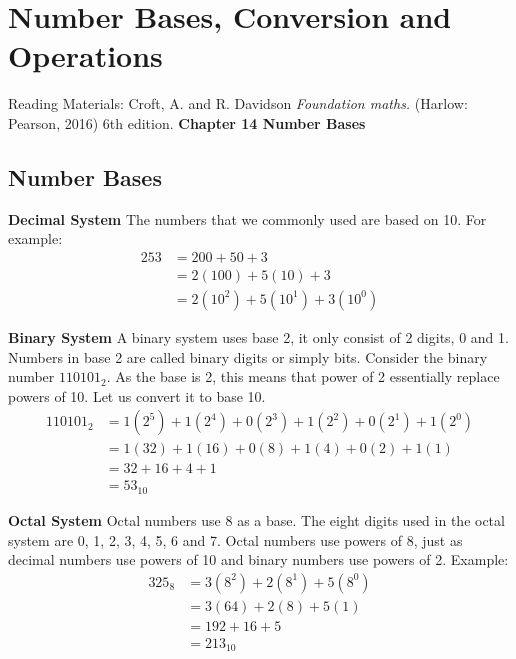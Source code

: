 \chapter{Number Bases, Conversion and Operations}

Reading Materials: \newline
Croft, A. and R. Davidson \textit{Foundation maths.} (Harlow: Pearson, 2016) 6th edition. \textbf{Chapter 14 Number Bases}
\section{Number Bases}

\noindent\large\textbf{Decimal System}\newline
\normalsize The numbers that we commonly used are based on 10.\newline
For example:
\begin{equation} \label{eq1}
\begin{split}
253 & = 200 + 50 + 3 \\
& = 2(100) + 5(10) + 3 \\
& = 2(10^2)+ 5(10^1) + 3(10^0)
\end{split}
\end{equation} 

\noindent\large\textbf{Binary System}\newline
\normalsize A binary system uses base 2, it only consist of 2 digits, 0 and 1.\newline
Numbers in base 2 are called binary digits or simply bits.\newline
Consider the binary number $110101_2$. As the base is 2, this means that power of 2 essentially replace powers of 10. Let us convert it to base 10.
\begin{equation} \label{eq2}
\begin{split}
110101_2 & = 1(2^5)+1(2^4)+0(2^3)+1(2^2)+0(2^1)+1(2^0) \\
& = 1(32)+1(16)+0(8)+1(4)+0(2)+1(1) \\
& = 32+16+4+1 \\
& = 53_{10}
\end{split}
\end{equation} 

\noindent\large\textbf{Octal System}\newline
\normalsize Octal numbers use 8 as a base. The eight digits used in the octal system are 0, 1, 2, 3, 4, 5, 6 and 7. Octal numbers use powers of 8, just as decimal numbers use powers of 10 and binary numbers use powers of 2. Example:
\begin{equation} \label{eq3}
\begin{split}
325_8 & = 3(8^2)+2(8^1)+5(8^0) \\
& = 3(64)+2(8)+5(1) \\
& = 192+16+5 \\
& = 213_{10}
\end{split}
\end{equation} 

